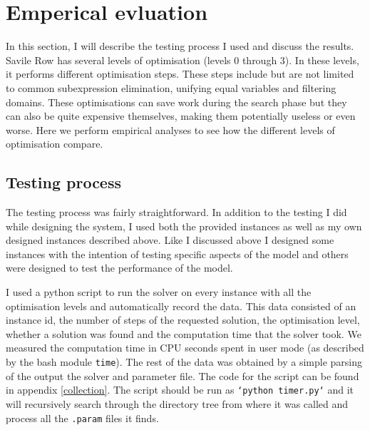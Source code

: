 \documentclass[british]{article}
\newcommand{\code}[1]{\texttt{#1}}
\begin{document}
	\section{Emperical evluation}
	\label{results}
	In this section, I will describe the testing process I used and discuss the results. Savile Row has several levels of optimisation (levels 0 through 3). In these levels, it performs different optimisation steps. These steps include but are not limited to common subexpression elimination, unifying equal variables and filtering domains. These optimisations can save work during the search phase but they can also be quite expensive themselves, making them potentially useless or even worse. Here we perform empirical analyses to see how the different levels of optimisation compare.  
	
	\subsection{Testing process}
	\label{testing}
	The testing process was fairly straightforward. In addition to the testing I did while designing the system, I used both the provided instances as well as my own designed instances described above. Like I discussed above I designed some instances with the intention of testing specific aspects of the model and others were designed to test the performance of the model. 
	
	I used a python script to run the solver on every instance with all the optimisation levels and automatically record the data. This data consisted of an instance id, the number of steps of the requested solution, the optimisation level, whether a solution was found and the computation time that the solver took. We measured the computation time in CPU seconds spent in user mode (as described by the bash module \code{time}).  The rest of the data was obtained by a simple parsing of the output the solver and parameter file. The code for the script can be found in appendix \ref{collection}. The script should be run as \code{`python timer.py`} and it will recursively search through the directory tree from where it was called and process all the \code{.param} files it finds. 
	
\end{document}
